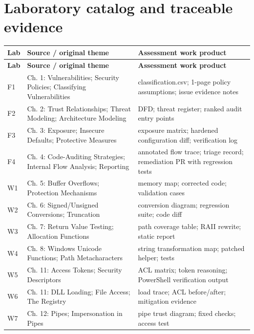 \documentclass[10pt,letterpaper]{article}
\begin{document}
\section{Laboratory catalog and traceable evidence}
\begingroup\footnotesize\setlength\tabcolsep{3pt}
\begin{longtable}{>{\raggedright\arraybackslash}p{}>{\raggedright\arraybackslash}p{}>{\raggedright\arraybackslash}p{}}\toprule
\textbf{Lab} & \textbf{Source / original theme} & \textbf{Assessment work product}\\\midrule\endfirsthead
\toprule \textbf{Lab} & \textbf{Source / original theme} & \textbf{Assessment work product}\\\midrule\endhead
F1 & Ch. 1: Vulnerabilities; Security Policies; Classifying Vulnerabilities & classification.csv; 1-page policy assumptions; issue evidence notes\\\midrule
F2 & Ch. 2: Trust Relationships; Threat Modeling; Architecture Modeling & DFD; threat register; ranked audit entry points\\\midrule
F3 & Ch. 3: Exposure; Insecure Defaults; Protective Measures & exposure matrix; hardened configuration diff; verification log\\\midrule
F4 & Ch. 4: Code-Auditing Strategies; Internal Flow Analysis; Reporting & annotated flow trace; triage record; remediation PR with regression tests\\\midrule
W1 & Ch. 5: Buffer Overflows; Protection Mechanisms & memory map; corrected code; validation cases\\\midrule
W2 & Ch. 6: Signed/Unsigned Conversions; Truncation & conversion diagram; regression suite; code diff\\\midrule
W3 & Ch. 7: Return Value Testing; Allocation Functions & path coverage table; RAII rewrite; static report\\\midrule
W4 & Ch. 8: Windows Unicode Functions; Path Metacharacters & string transformation map; patched helper; tests\\\midrule
W5 & Ch. 11: Access Tokens; Security Descriptors & ACL matrix; token reasoning; PowerShell verification output\\\midrule
W6 & Ch. 11: DLL Loading; File Access; The Registry & load trace; ACL before/after; mitigation evidence\\\midrule
W7 & Ch. 12: Pipes; Impersonation in Pipes & pipe trust diagram; fixed checks; access test\\\midrule

\end{longtable}
\end{document}
